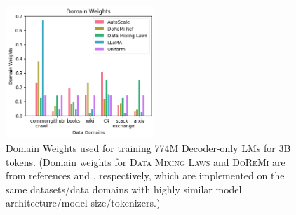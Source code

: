 \documentclass{article} %
\begin{document}
\begin{appendices}{}
\begin{figure}[t!]
\begin{center}
  \includegraphics[width=0.5\textwidth]{gptfigs/dw500.png}
  \vspace{-1em}
  \caption{Domain Weights used for training 774M Decoder-only LMs for 3B tokens. (Domain weights for \textsc{Data Mixing Laws} and \textsc{DoReMi} are from references \citep{ye2024data} and \citep{fan2023doge}, respectively, which are implemented on the same datasets/data domains with highly similar model architecture/model size/tokenizers.)
  }\label{fig:weights_gpt}
  \vspace{-1em}
  \end{center}
\end{figure}%




\end{appendices}
\end{document}
